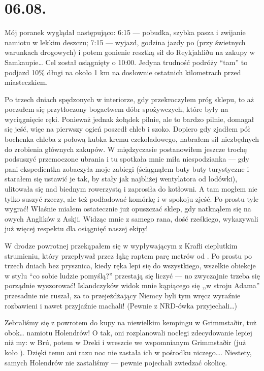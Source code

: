 \chapter*{06.08.}

Mój poranek wyglądał następująco: 6:15 --- pobudka, szybka pasza i zwijanie namiotu w lekkim deszczu; 7:15 --- wyjazd, godzina jazdy po  (przy świetnych warunkach drogowych) i potem gonienie resztką sił do Reykjahliðu na zakupy w Samkaupie… Cel został osiągnięty o 10:00. Jedyna trudność podróży “tam” to podjazd 10\% długi na około 1 km na dosłownie ostatnich kilometrach przed miasteczkiem.

Po trzech dniach spędzonych w interiorze, gdy przekroczyłem próg sklepu, to aż poczułem się przytłoczony bogactwem dóbr spożywczych, które były na wyciągnięcie ręki. Ponieważ jednak żołądek pilnie, ale to bardzo pilnie, domagał się jeść, więc na pierwszy ogień poszedł chleb i szoko. Dopiero gdy zjadłem pół bochenka chleba z połową kubka kremu czekoladowego, nabrałem sił niezbędnych do zrobienia głównych zakupów. W międzyczasie postanowiłem jeszcze trochę podsuszyć przemoczone ubrania i tu spotkała mnie miła niespodzianka --- gdy pani ekspedientka zobaczyła moje zabiegi (ściągnąłem buty buty turystyczne i starałem się ustawić je tak, by stały jak najbliżej wentylatora od lodówki), ulitowała się nad biednym rowerzystą i zaprosiła do kotłowni. A tam mogłem nie tylko suszyć rzeczy, ale też podładować komórkę i w spokoju zjeść. Po prostu tyle wygrać! Właśnie miałem ostatecznie już opuszczać sklep, gdy natknąłem się na owych Anglików z Askji. Widząc mnie z samego rana, dość rześkiego, wykazywali już więcej respektu dla osiągnięć naszej ekipy!

W drodze powrotnej przekąpałem się w wypływającym z Krafli cieplutkim strumieniu, który przepływał przez łąkę raptem parę metrów od . Po prostu po trzech dniach bez prysznica, kiedy ręka lepi się do wszystkiego, wszelkie obiekcje w stylu “co sobie ludzie pomyślą?” przestają się liczyć --- no zwyczajnie trzeba się porządnie wyszorować! Islandczyków widok mnie kąpiącego się ,,w stroju Adama'' przesadnie nie ruszał, za to przejeżdżający Niemcy byli tym wręcz wyraźnie rozbawieni i nawet przyjaźnie machali! (Pewnie z NRD-ówka przyjechali…)

Zebraliśmy się z powrotem do kupy na niewielkim kempingu w Grimmstaðir, tuż obok… namiotu Holendrów! O tak, oni rozplanowali noclegi zdecydowanie lepiej niż my: w Brú, potem w Dreki i wreszcie we wspomnianym Grimmstaðir (już koło ). Dzięki temu ani razu noc nie zastała ich w pośrodku niczego…. Niestety, samych Holendrów nie zastaliśmy --- pewnie pojechali zwiedzać okolicę.

